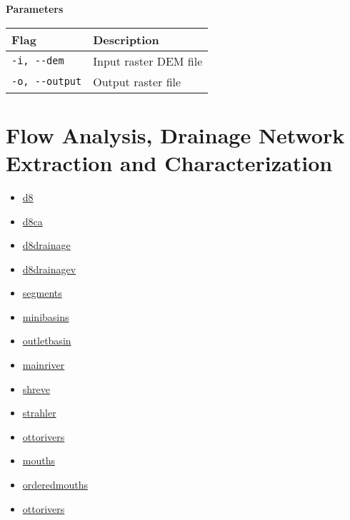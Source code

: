 \documentclass[
]{book}
\providecommand{\tightlist}{%
  \setlength{\itemsep}{0pt}\setlength{\parskip}{0pt}}
\theoremstyle{definition}
\theoremstyle{definition}
\theoremstyle{definition}
\theoremstyle{definition}
\theoremstyle{remark}
\begin{document}
\textbf{Parameters}

\begin{longtable}[]{@{}ll@{}}
\toprule\noalign{}
Flag & Description \\
\midrule\noalign{}
\endhead
\bottomrule\noalign{}
\endlastfoot
\texttt{-i,\ -\/-dem} & Input raster DEM file \\
\texttt{-o,\ -\/-output} & Output raster file \\
\end{longtable}

\section{Flow Analysis, Drainage Network Extraction and Characterization}\label{Flow-Analysis-Drainage-Network-Extraction-and-Characterization}

\begin{itemize}
\tightlist
\item
  \hyperref[d8]{d8}\\
\item
  \hyperref[d8ca]{d8ca}\\
\item
  \hyperref[d8drainage]{d8drainage}\\
\item
  \hyperref[d8drainagev]{d8drainagev}\\
\item
  \hyperref[segments]{segments}\\
\item
  \hyperref[minibasins]{minibasins}\\
\item
  \hyperref[outletbasin]{outletbasin}\\
\item
  \hyperref[mainriver]{mainriver}\\
\item
  \hyperref[shreve]{shreve}\\
\item
  \hyperref[strahler]{strahler}\\
\item
  \hyperref[ottorivers]{ottorivers}\\
\item
  \hyperref[mouths]{mouths}\\
\item
  \hyperref[orderedmouths]{orderedmouths}
\item
  \hyperref[ottorivers]{ottorivers}
\end{itemize}
\end{document}

